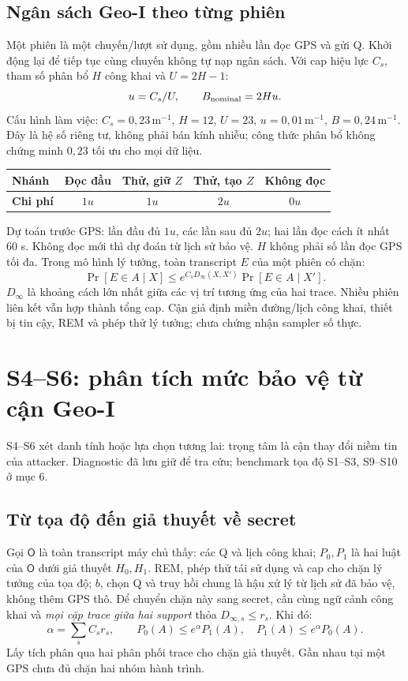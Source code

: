 \documentclass[10pt,a4paper]{article}
\begin{document}
\subsection{Ngân sách Geo-I theo từng phiên}
Một phiên là một chuyến/lượt sử dụng, gồm nhiều lần đọc GPS và gửi Q. Khởi động lại để tiếp tục cùng chuyến không tự nạp ngân sách.
Với cap hiệu lực $C_s$, tham số phân bổ $H$ công khai và $U=2H-1$:
\[
u=C_s/U,\qquad B_{\rm nominal}=2Hu.
\]
Cấu hình làm việc: $C_s=0{,}23\,\mathrm m^{-1}$, $H=12$, $U=23$, $u=0{,}01\,\mathrm m^{-1}$, $B=0{,}24\,\mathrm m^{-1}$.
Đây là hệ số riêng tư, không phải bán kính nhiễu; công thức phân bổ không chứng minh $0{,}23$ tối ưu cho mọi dữ liệu.
\par\smallskip
\begin{tabularx}{\linewidth}{@{}Ycccc@{}}\toprule
\textbf{Nhánh} & Đọc đầu & Thử, giữ $Z$ & Thử, tạo $Z$ & Không đọc\\\midrule
\textbf{Chi phí} & $1u$ & $1u$ & $2u$ & $0u$\\\bottomrule
\end{tabularx}
Dự toán trước GPS: lần đầu đủ $1u$, các lần sau đủ $2u$; hai lần đọc cách ít nhất 60 s.
Không đọc mới thì dự đoán từ lịch sử bảo vệ. $H$ không phải số lần đọc GPS tối đa.
Trong mô hình lý tưởng, toàn transcript $E$ của một phiên có chặn:
\[
\Pr[E\in A\mid X]\leq e^{C_sD_\infty(X,X')}\Pr[E\in A\mid X'].
\]
$D_\infty$ là khoảng cách lớn nhất giữa các vị trí tương ứng của hai trace.
Nhiều phiên liên kết vẫn hợp thành tổng cap. Cận giả định miền đường/lịch công khai, thiết bị tin cậy,
REM và phép thử lý tưởng; chưa chứng nhận sampler số thực.
\clearpage
\section{S4--S6: phân tích mức bảo vệ từ cận Geo-I}
\begingroup\setlength{\parskip}{3pt}\renewcommand{\arraystretch}{1.06}
S4--S6 xét danh tính hoặc lựa chọn tương lai: trọng tâm là cận thay đổi niềm tin của attacker.
Diagnostic đã lưu giữ để tra cứu; benchmark tọa độ S1--S3, S9--S10 ở mục 6.

\subsection{Từ tọa độ đến giả thuyết về secret}
Gọi $\mathsf O$ là toàn transcript máy chủ thấy: các Q và lịch công khai; $P_0,P_1$ là hai luật của $\mathsf O$
dưới giả thuyết $H_0,H_1$. REM, phép thử tái sử dụng và cap cho chặn lý tưởng của tọa độ;
$b$, chọn Q và truy hồi chung là hậu xử lý từ lịch sử đã bảo vệ, không thêm GPS thô.
Để chuyển chặn này sang secret, cần cùng ngữ cảnh công khai và \emph{mọi cặp trace giữa hai support}
thỏa $D_{\infty,s}\leq r_s$. Khi đó:
\[
 \alpha=\sum_s C_s r_s,\qquad
 P_0(A)\leq e^\alpha P_1(A),\quad P_1(A)\leq e^\alpha P_0(A).
\]
Lấy tích phân qua hai phân phối trace cho chặn giả thuyết. Gần nhau tại một GPS chưa đủ chặn hai nhóm hành trình.
\end{document}
